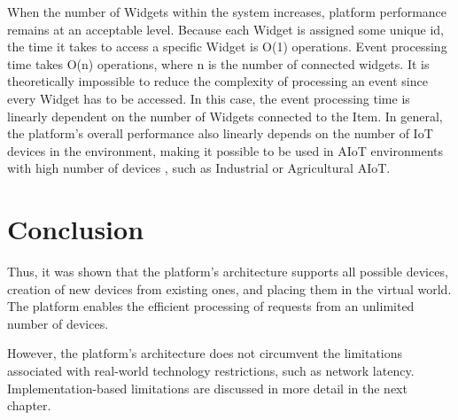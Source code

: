 When the number of Widgets within the system increases, platform performance remains at an acceptable level. Because each Widget is assigned some unique id, the time it takes to access a specific Widget is O(1) operations. Event processing time takes O(n) operations, where n is the number of connected widgets. It is theoretically impossible to reduce the complexity of processing an event since every Widget has to be accessed. In this case, the event processing time is linearly dependent on the number of Widgets connected to the Item. In general, the platform's overall performance also linearly depends on the number of IoT devices in the environment, making it possible to be used in AIoT environments with high number of devices , such as Industrial or Agricultural AIoT.

\section{Conclusion}

Thus, it was shown that the platform's architecture supports all possible devices, creation of new devices from existing ones, and placing them in the virtual world. The platform enables the efficient processing of requests from an unlimited number of devices.


However, the platform's architecture does not circumvent the limitations associated with real-world technology restrictions, such as network latency. Implementation-based limitations are discussed in more detail in the next chapter.
